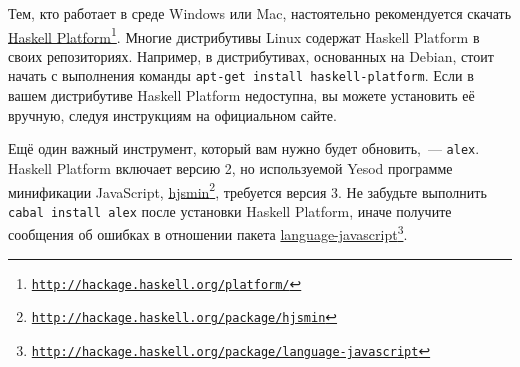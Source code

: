 Тем, кто работает в среде Windows или Mac, настоятельно рекомендуется скачать \href{http://hackage.haskell.org/platform/}{Haskell Platform}\footnote{\href{http://hackage.haskell.org/platform/}{\texttt{http://hackage.haskell.org/platform/}}}. Многие дистрибутивы Linux содержат Haskell Platform в своих репозиториях. Например, в дистрибутивах, основанных на Debian, стоит начать с выполнения команды \texttt{apt-get install haskell-platform}. Если в вашем дистрибутиве Haskell Platform недоступна, вы можете установить её вручную, следуя инструкциям на официальном сайте.

Ещё один важный инструмент, который вам нужно будет обновить,~--- \texttt{alex}. Haskell Platform включает версию 2, но используемой Yesod программе минификации JavaScript, \href{http://hackage.haskell.org/package/hjsmin}{hjsmin}\footnote{\href{http://hackage.haskell.org/package/hjsmin}{\texttt{http://hackage.haskell.org/package/hjsmin}}}, требуется версия 3. Не забудьте выполнить \texttt{cabal install alex} после установки Haskell Platform, иначе получите сообщения об ошибках в отношении пакета \href{http://hackage.haskell.org/package/language-javascript}{language-javascript}\footnote{\href{http://hackage.haskell.org/package/language-javascript}{\texttt{http://hackage.haskell.org/package/language-javascript}}}.


